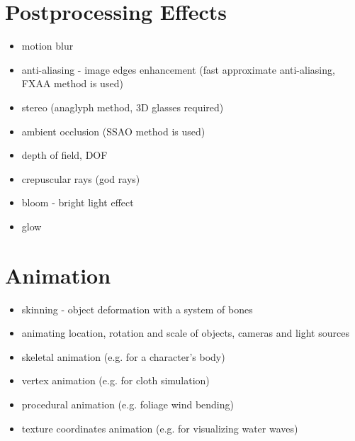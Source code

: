 \documentclass[a4paper,12pt,oneside]{sphinxmanual}
\begin{document}
\section{Postprocessing Effects}
\label{features:id8}\begin{itemize}
\item {} 
motion blur

\item {} 
anti-aliasing - image edges enhancement (fast approximate anti-aliasing, FXAA method is used)

\item {} 
stereo (anaglyph method, 3D glasses required)

\item {} 
ambient occlusion (SSAO method is used)

\item {} 
depth of field, DOF

\item {} 
crepuscular rays (god rays)

\item {} 
bloom - bright light effect

\item {} 
glow

\end{itemize}


\section{Animation}
\label{features:id9}\begin{itemize}
\item {} 
skinning - object deformation with a system of bones

\item {} 
animating location, rotation and scale of objects, cameras and light sources

\item {} 
skeletal animation (e.g. for a character's body)

\item {} 
vertex animation (e.g. for cloth simulation)

\item {} 
procedural animation (e.g. foliage wind bending)

\item {} 
texture coordinates animation (e.g. for visualizing water waves)

\end{itemize}
\end{document}
